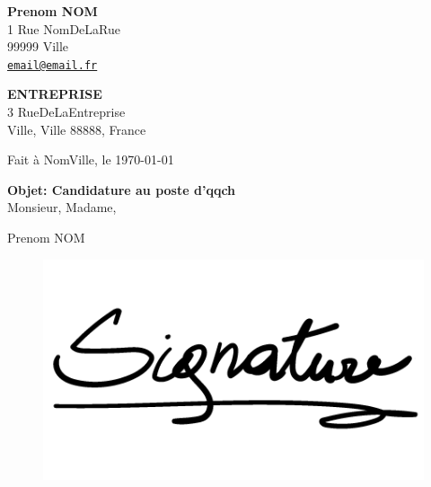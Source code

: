 \documentclass[12pt]{article}
\makeatletter
\newcommand\authorlm{Prenom NOM}
\newcommand\datation{Fait à NomVille, le \today}
\newcommand\objet{Candidature au poste d'qqch}
\newcommand\mondirection{1 Rue NomDeLaRue}
\newcommand\codepostaletville{99999 Ville}
\newcommand\email{\href{mailto:email@email.fr}{\texttt{email@email.fr}}}
\newcommand\entreprisedestinataire{\textbf{ENTREPRISE}}
\newcommand\directionentreprise{3 RueDeLaEntreprise}
\newcommand\entreprisevillecodepostalpays{Ville, Ville 88888, France}
\makeatother
\begin{document}
\pagestyle{empty}

\textbf{\authorlm}\\
\mondirection\\
\codepostaletville\\
\email\\

\begin{flushright}
\entreprisedestinataire\\
\directionentreprise\\
\entreprisevillecodepostalpays\\
\end{flushright}

\datation\\
\par\bigskip\textbf{Objet: \objet}\\




Monsieur, Madame, 



\lipsum[1-2]




\bigskip
\begin{flushright}
	\authorlm\\
\end{flushright}


\begin{figure}[h]
  \raggedleft
  \includegraphics[scale=0.2]{signature/signature-template.png}
\end{figure}
\end{document}
